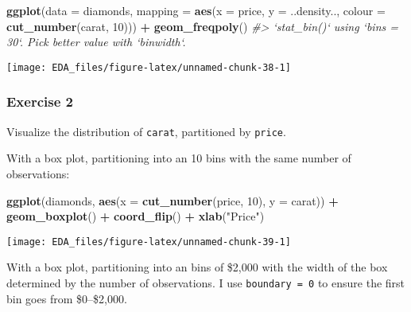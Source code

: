 \documentclass[]{book}
\newenvironment{Shaded}{\begin{snugshade}}{\end{snugshade}}
\newcommand{\CommentTok}[1]{\textcolor[rgb]{0.56,0.35,0.01}{\textit{#1}}}
\newcommand{\DataTypeTok}[1]{\textcolor[rgb]{0.13,0.29,0.53}{#1}}
\newcommand{\DecValTok}[1]{\textcolor[rgb]{0.00,0.00,0.81}{#1}}
\newcommand{\KeywordTok}[1]{\textcolor[rgb]{0.13,0.29,0.53}{\textbf{#1}}}
\newcommand{\NormalTok}[1]{#1}
\newcommand{\OperatorTok}[1]{\textcolor[rgb]{0.81,0.36,0.00}{\textbf{#1}}}
\newcommand{\StringTok}[1]{\textcolor[rgb]{0.31,0.60,0.02}{#1}}
\theoremstyle{definition}
\theoremstyle{definition}
\theoremstyle{definition}
\theoremstyle{remark}
\begin{document}
\begin{Shaded}
\begin{Highlighting}[]
\KeywordTok{ggplot}\NormalTok{(}\DataTypeTok{data =}\NormalTok{ diamonds,}
       \DataTypeTok{mapping =} \KeywordTok{aes}\NormalTok{(}\DataTypeTok{x =}\NormalTok{ price,}
                     \DataTypeTok{y =}\NormalTok{ ..density..,}
                     \DataTypeTok{colour =} \KeywordTok{cut_number}\NormalTok{(carat, }\DecValTok{10}\NormalTok{))) }\OperatorTok{+}
\StringTok{  }\KeywordTok{geom_freqpoly}\NormalTok{()}
\CommentTok{#> `stat_bin()` using `bins = 30`. Pick better value with `binwidth`.}
\end{Highlighting}
\end{Shaded}

\begin{center}\texttt{[image: EDA\_files/figure-latex/unnamed-chunk-38-1]} \end{center}

\hypertarget{exercise-2-11}{%
\subsubsection{Exercise 2}\label{exercise-2-11}}

Visualize the distribution of \texttt{carat}, partitioned by
\texttt{price}.

With a box plot, partitioning into an 10 bins with the same number of
observations:

\begin{Shaded}
\begin{Highlighting}[]
\KeywordTok{ggplot}\NormalTok{(diamonds, }\KeywordTok{aes}\NormalTok{(}\DataTypeTok{x =} \KeywordTok{cut_number}\NormalTok{(price, }\DecValTok{10}\NormalTok{), }\DataTypeTok{y =}\NormalTok{ carat)) }\OperatorTok{+}
\StringTok{  }\KeywordTok{geom_boxplot}\NormalTok{() }\OperatorTok{+}
\StringTok{  }\KeywordTok{coord_flip}\NormalTok{() }\OperatorTok{+}
\StringTok{  }\KeywordTok{xlab}\NormalTok{(}\StringTok{"Price"}\NormalTok{)}
\end{Highlighting}
\end{Shaded}

\begin{center}\texttt{[image: EDA\_files/figure-latex/unnamed-chunk-39-1]} \end{center}

With a box plot, partitioning into an bins of \$2,000 with the width of
the box determined by the number of observations. I use
\texttt{boundary\ =\ 0} to ensure the first bin goes from \$0--\$2,000.
\end{document}
